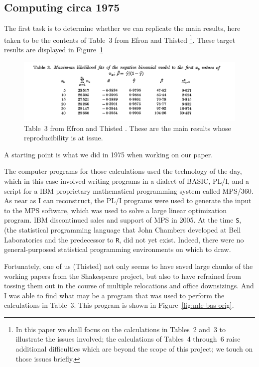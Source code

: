 \subsection{Computing circa 1975} %
\label{sub:computing_circa_1975}
The first task is to determine whether we can replicate the main results, here taken to be the contents of Table~3 from Efron and Thisted \citeyear{Efron:1976zs}\footnote{In this paper we shall focus on the calculations in Tables~2 and~3 to illustrate the issues involved; the calculations of Tables~4 through~6 raise additional difficulties which are beyond the scope of this project; we touch on those issues briefly.}.  These target results are displayed in Figure~\ref{fig:ETT3}

\begin{figure}
	\centering
	\includegraphics[width=6in]{../compendium/Figures/ET-Table3.pdf}
	\caption{Table~3 from Efron and Thisted \citeyear{Efron:1976zs}.  These are the main results whose reproducibility is at issue. }
	\label{fig:ETT3}
\end{figure}

A starting point is what we did in 1975 when working on our paper.

The computer programs for those calculations used the technology of the day, which in this case involved writing programs in a dialect of BASIC, PL/I, and a script for a IBM proprietary mathematical programming system called MPS/360. As near as I can reconstruct, the PL/I programs were used to generate the input to the MPS software, which was used to solve a large linear optimization program.  IBM discontinued sales and support of MPS in 2005. At the time \texttt{S}, (the statistical programming language that John Chambers developed at Bell Laboratories and the predecessor to \texttt{R}, did not yet exist.  Indeed, there were no general-purposed statistical programming environments on which to draw.

Fortunately, one of us (Thisted) not only seems to have saved large chunks of the working papers from the Shakespeare project, but also to have refrained from tossing them out in the course of multiple relocations and office downsizings.  And I was able to find what may be a program that was used to perform the calculations in Table~3. This program is shown in Figure~\ref{fig:mle-bas-orig}.

